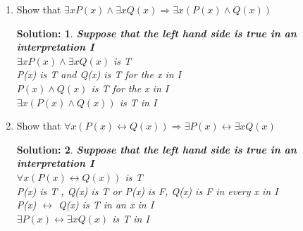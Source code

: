 \documentclass{article}
\theoremstyle{break}
\newtheorem*{solution*}{\textbf{Solution:} }
\begin{document}
\begin{enumerate}
        \item Show that $\exists x P(x) \land \exists x Q(x) \Rightarrow \exists x (P(x) \land Q(x))$
        \begin{solution*}
                \textbf{Suppose that the left hand side is true in an interpretation I}\\
                $\exists x P(x) \land \exists x Q(x)$ is T \\
                P(x) is T and Q(x) is T for the x in I \\
                $P(x) \land Q(x)$ is T for the x in I \\
                $\exists x (P(x) \land Q(x))$ is T in I\\
        \end{solution*}

        \newpage
        \item Show that $\forall x (P(x) \leftrightarrow Q(x)) \Rightarrow \exists P(x) \leftrightarrow \exists x Q(x)$
        \begin{solution*}
                \textbf{Suppose that the left hand side is true in an interpretation I}\\
                $\forall x (P(x) \leftrightarrow Q(x)) $ is T\\
                P(x) is T , Q(x) is T or P(x) is F, Q(x) is F in every x in I\\
                P(x) $\leftrightarrow $ Q(x) is T in an x in I\\
                $\exists P(x) \leftrightarrow \exists x Q(x)$ is T in I\\
        \end{solution*}
\end{enumerate}
\end{document}

